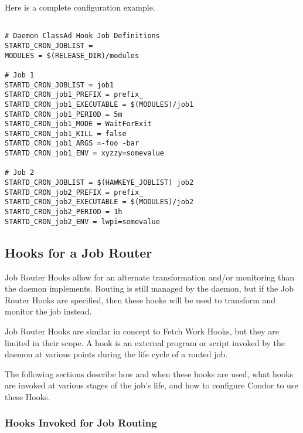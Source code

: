 Here is a complete configuration example.
\begin{verbatim}

# Daemon ClassAd Hook Job Definitions
STARTD_CRON_JOBLIST =
MODULES = $(RELEASE_DIR)/modules

# Job 1
STARTD_CRON_JOBLIST = job1
STARTD_CRON_job1_PREFIX = prefix_
STARTD_CRON_job1_EXECUTABLE = $(MODULES)/job1
STARTD_CRON_job1_PERIOD = 5m
STARTD_CRON_job1_MODE = WaitForExit
STARTD_CRON_job1_KILL = false
STARTD_CRON_job1_ARGS =-foo -bar
STARTD_CRON_job1_ENV = xyzzy=somevalue

# Job 2
STARTD_CRON_JOBLIST = $(HAWKEYE_JOBLIST) job2
STARTD_CRON_job2_PREFIX = prefix_
STARTD_CRON_job2_EXECUTABLE = $(MODULES)/job2
STARTD_CRON_job2_PERIOD = 1h
STARTD_CRON_job2_ENV = lwpi=somevalue

\end{verbatim}


\subsection{\label{sec:job-hooks-JR-overview}
Hooks for a Job Router}

Job Router Hooks allow for an alternate transformation and/or 
monitoring than the  daemon implements.
Routing is still managed by the  daemon,
but if the Job Router Hooks are specified,
then these hooks will be used to transform
and monitor the job instead.

Job Router Hooks are similar in concept to Fetch Work Hooks,
but they are limited in their scope.
A hook is an external program or script invoked by the 
daemon at various points during the life cycle of a routed job.

The following sections describe how and when these hooks are used,
what hooks are invoked at various stages of the job's life, 
and how to configure Condor to use these Hooks.

\subsubsection{\label{sec:job-hooks-JR}
Hooks Invoked for Job Routing}

